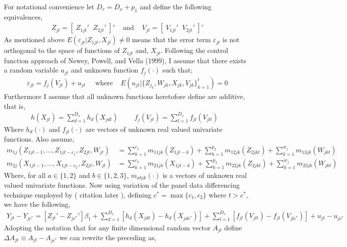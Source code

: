 \documentclass[10pt]{article}
\begin{document}
 \noindent For notational convenience let $D_v = D_x + p_1$ and define the following equivalences, 
\begin{align*} 
Z_{jt} = [\; Z_{1jt}' \;\; Z_{2jt}' \;]'  \;\;\; \text{ and } \;\;\; V_{jt} = [ \; V_{1jt}' \;\;V_{2jt}'\;]'
\end{align*}
 As mentioned above $E(\varepsilon_{jt} | Z_{1jt} , X_{jt}) \neq 0$ means that the error term $\varepsilon_{jt}$ is not orthogonal to the space of functions of $Z_{1jt}$ and, $X_{jt}$. Following the control function approach of Newey, Powell, and Vella (1999), I assume that there exists a random variable $u_{jt}$ and unknown function $f_j(\cdot)$ such that; 
 \begin{align*} 
 \varepsilon_{jt} = f_j(V_{jt}) + u_{jt}  \;\;\;\ \text{ where } \;\;\; E(u_{jt} | \{Z_{j_k},W_{jk},X_{jk},V_{jk} \}_{k=1}^t) = 0
 \end{align*}
 Furthermore I assume that all unknown functions heretofore define are additive, that is,
 \begin{align*} 
 h(X_{jt}) = \sum_{d=1}^{D_x} h_d(X_{jdt}) \hspace{1cm}  f_j(V_{jt}) = \sum_{l=1}^{D_v} f_{jl}(V_{jlt}) \;\;\;  
 \end{align*}
Where $h_{d}(\cdot)$ and $f_{jl}(\cdot)$ are vectors of unknown real valued univariate functions. Also assume, 
\begin{align*} 
m_{1j}(Z_{1jt-1},\ldots,Z_{1jt-c_1},Z_{2jt},W_{jt}) &= \sum_{k = 1}^{c_1} m_{11jk}(Z_{1jt-k}) + \sum_{k=1}^{p_2}m_{12jk}(Z_{2jkt}) + \sum_{k=1}^{w_j} m_{13jk}(W_{jkt}) \\
%
m_{2j}(X_{1jt-1},\ldots,X_{1jt-c_2},Z_{2jt},W_{jt}) &= \sum_{k = 1}^{c_2} m_{21jk}(X_{1jt-k}) + \sum_{k=1}^{p_2}m_{22jk}(Z_{2jkt}) + \sum_{k=1}^{w_j} m_{23jk}(W_{jkt}) 
\end{align*}
Where, for all $a\in\{1,2\}$ and $b\in \{1,2,3\}$, $m_{abjk}(\cdot)$ is a vectors of unknown real valued univariate functions. 
Now using variation of the panel data differencing technique employed by ( citation later ), defining $c^* = \max\{c_1,c_2\}$ where $t>c^*$, we have the following, 
\begin{align*} 
Y_{jt} - Y_{jc^*} = [ Z_{jt}' - Z_{jc^*}' ]\beta_1 + \sum_{d=1}^{D_x} [ h_d(X_{jdt}) - h_d(X_{jdc^*})] +  \sum_{l=1}^{D_v} [ f_{jl}(V_{jlt}) - f_{jl}(V_{jlc^*})] + u_{jt} - u_{jc^*}
\end{align*}
Adopting the notation that for any finite dimensional random vector $A_{jt}$ define $\Delta A_{jt}  \equiv A_{jt} - A_{jc^*}$ we can rewrite the preceding as,
\end{document}
